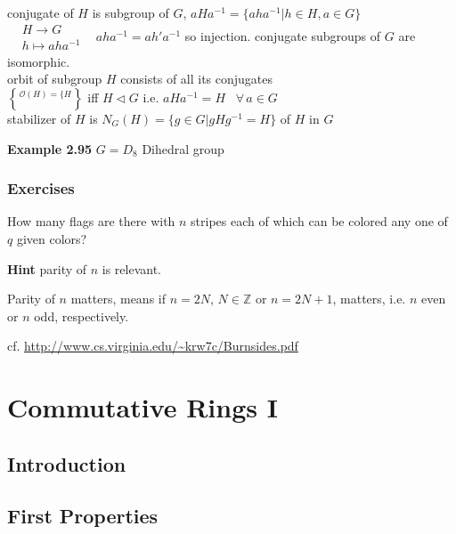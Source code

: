 \documentclass[twoside,landscape]{amsart}
\theoremstyle{plain}
\theoremstyle{definition}
\theoremstyle{remark}
\newcommand{\exercisehead}[1]
  { \smallskip
   \noindent{\small\bf Exercise #1.}
  }
\begin{document}
\begin{multicols*}{2}
conjugate of $H$ is subgroup of $G$, $aHa^{-1} = \lbrace aha^{-1} | h \in H, a\in G \rbrace$ \\
$\begin{aligned}
  & H \to G \\
  & h \mapsto aha^{-1} \end{aligned}$ \quad \quad \, $aha^{-1} = ah' a^{-1}$ so injection.  conjugate subgroups of $G$ are isomorphic.   \\


orbit of subgroup $H$ consists of all its conjugates \\
\quad $\mathcal{O}(H) = \lbrace H \brace $ iff $H \lhd G$ i.e. $aHa^{-1}=H $ \quad \, $ \forall \, a \in G$ \\

stabilizer of $H$ is $N_G(H) = \lbrace g\in G | gHg^{-1} = H \rbrace$ \quad {} of $H$ in $G$

\textbf{Example 2.95} $G = D_8$ Dihedral group

\subsubsection*{Exercises}

\exercisehead{2.100} How many flags are there with $n$ stripes each of which can be colored any one of $q$ given colors?

\textbf{Hint} parity of $n$ is relevant.

Parity of $n$ matters, means if $n=2N$, $N\in\mathbb{Z}$ or $n=2N+1$, matters, i.e. $n$ even or $n$ odd, respectively.  

cf. \url{http://www.cs.virginia.edu/~krw7c/Burnsides.pdf}


\section{Commutative Rings I}



\subsection{Introduction}




\subsection{First Properties }


\end{multicols*}
\end{document}
